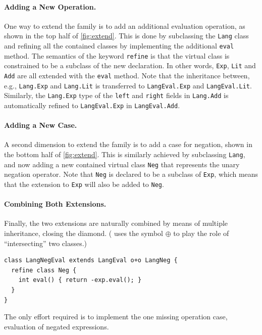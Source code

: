 \paragraph{Adding a New Operation.}

One way to extend the family is to add an additional evaluation operation, as
shown in the top half of \cref{fig:extend}. This is done by subclassing the
\lstinline{Lang} class and refining all the contained classes by implementing
the additional \lstinline{eval} method. The semantics of the keyword
\lstinline[language=gbeta]{refine} is that the virtual class is constrained to
be a subclass of the new declaration. In other words, \lstinline{Exp},
\lstinline{Lit} and \lstinline{Add} are all extended with the \lstinline{eval}
method. Note that the inheritance between, e.g., \lstinline{Lang.Exp} and
\lstinline{Lang.Lit} is transferred to \lstinline{LangEval.Exp} and
\lstinline{LangEval.Lit}. Similarly, the \lstinline{Lang.Exp} type of the
\lstinline{left} and \lstinline{right} fields in \lstinline{Lang.Add} is
automatically refined to \lstinline{LangEval.Exp} in \lstinline{LangEval.Add}.

\paragraph{Adding a New Case.}

A second dimension to extend the family is to add a case for negation, shown in
the bottom half of \cref{fig:extend}. This is similarly achieved by subclassing
\lstinline{Lang}, and now adding a new contained virtual class \lstinline{Neg}
that represents the unary negation operator. Note that \lstinline{Neg} is
declared to be a subclass of \lstinline{Exp}, which means that the extension to
\lstinline{Exp} will also be added to \lstinline{Neg}.


\paragraph{Combining Both Extensions.}

Finally, the two extensions are naturally combined by means of multiple
inheritance, closing the diamond. (\citeauthor{ernst2004expression} uses the
symbol $\oplus$ to play the role of ``intersecting'' two classes.)
\begin{lstlisting}[language=gbeta]
class LangNegEval extends LangEval o+o LangNeg {
  refine class Neg {
    int eval() { return -exp.eval(); }
  }
}
\end{lstlisting}
The only effort required is to implement the one missing operation
case, evaluation of negated expressions.




